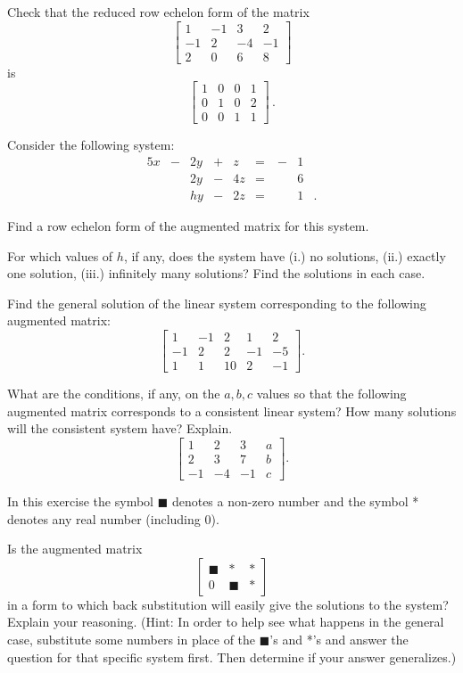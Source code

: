 \item Check that the reduced row echelon form of the matrix 
\[ \left[ \begin{array}{rrrr} 1 &-1& 3& 2 \\ -1& 2&-4&-1 \\ 2&0&6&8 \end{array} \right] \]
is
\[ \left[ \begin{array}{cccc} 1 &0&0&1 \\ 0&1&0&2 \\ 0&0&1&1 \end{array} \right] \, .\]

\item Consider the following system:
\begin{alignat*}{5}
{}x 	&{}-{} 	&{2}y 	&{}+{} 	&{}z 		&{}={}	&\ {-}&1&{}   \\
{}		&{}		&{2}y	&{}-{} 	&{4}z	&{}={} 	& \ {}&6&{} \\ 
{}		&{}		&{h}y	&{}-{} 	&{2}z	&{}={} 	& \ {}&1&{.} 
\end{alignat*}
	\ba
	\item Find a row echelon form of the augmented matrix for this system.

	\item For which values of $h$, if any, does the system have (i.) no solutions, (ii.) exactly one solution, (iii.) infinitely many solutions? Find the solutions in each case.

	\ea

\item Find the general solution of the linear system corresponding to the following augmented matrix:
\[\left[ \begin{array}{rrcr|r} 1&-1&2&1&2 \\ -1&2&2&-1&-5\\ 1&1&10&2&-1 \end{array}  \right].\]

\item What are the conditions, if any, on the $a, b, c$ values so that the following augmented matrix corresponds to a consistent linear system? How many solutions will the consistent system have? Explain. 
\[\left[ \begin{array}{rrr|c} 1 & 2 & 3 &a \\ 2&3&7&b \\ -1&-4&-1&c \end{array}  \right].\]

\item In this exercise the symbol $\blacksquare$ denotes a non-zero number and the symbol * denotes any real number (including $0$).
\ba
\item Is the augmented matrix 
\[\left[ \begin{array}{cc|c} \blacksquare&*&* \\ 0&\blacksquare&* \end{array} \right]\]
in a form to which back substitution will easily give the solutions to the system?  Explain your reasoning. (Hint: In order to help see what happens in the general case, substitute some numbers in place of the $\blacksquare$'s and *'s and answer the question for that specific system first. Then determine if your answer generalizes.)


